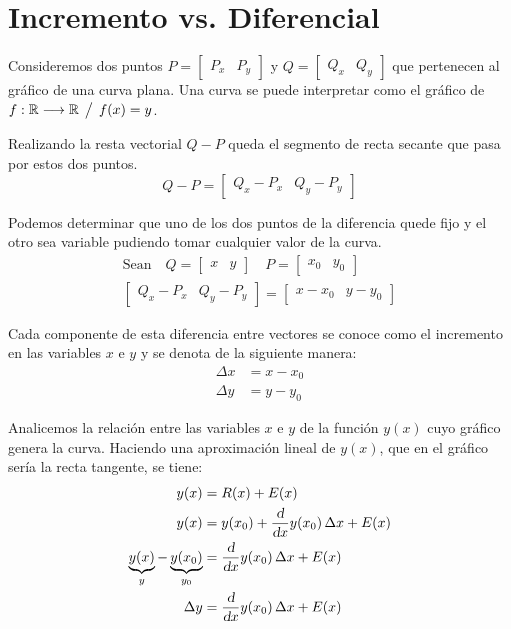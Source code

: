 \documentclass[a5paper,12pt,twoside]{book}
\begin{document}
\section{Incremento vs. Diferencial}

Consideremos dos puntos $P=\begin{bmatrix} P_x & P_y \end{bmatrix}$ y $Q=\begin{bmatrix} Q_x & Q_y \end{bmatrix}$ que pertenecen al gráfico de una curva plana.
Una curva se puede interpretar como el gráfico de $f:\mathbb{R} \longrightarrow \mathbb{R} \hspace{1ex} \big/ \hspace{1ex} f(x)=y$.

Realizando la resta vectorial $Q-P$ queda el segmento de recta secante que pasa por estos dos puntos.
\begin{equation*}
    Q-P = \begin{bmatrix} Q_x-P_x & Q_y-P_y \end{bmatrix}
\end{equation*}

Podemos determinar que uno de los dos puntos de la diferencia quede fijo y el otro sea variable pudiendo tomar cualquier valor de la curva.
\begin{gather*}
    \textrm{Sean} \quad
    Q = \begin{bmatrix}x&y\end{bmatrix} \quad P = \begin{bmatrix}x_0&y_0\end{bmatrix}
    \\
    \begin{bmatrix}Q_x-P_x & Q_y-P_y\end{bmatrix} = \begin{bmatrix}x-x_0 & y-y_0\end{bmatrix}
\end{gather*}

Cada componente de esta diferencia entre vectores se conoce como el incremento en las variables $x$ e $y$ y se denota de la siguiente manera:
\begin{align*}
    \Delta x &= x-x_0
    \\
    \Delta y &= y-y_0
\end{align*}

Analicemos la relación entre las variables $x$ e $y$ de la función $y(x)$ cuyo gráfico genera la curva.
Haciendo una aproximación lineal de $y(x)$, que en el gráfico sería la recta tangente, se tiene:
\begin{align*}
    y(x) &= R(x)+E(x)
    \\
    y(x) &= y(x_0) + \frac{\textsl{d}}{\textsl{d} x} y(x_0) \, \Delta x +E(x)
    \\
    \underbrace{y(x)}_y - \underbrace{y(x_0)}_{y_0} &= \frac{\textsl{d}}{\textsl{d} x} y(x_0) \, \Delta x +E(x)
    \\
    \Delta y &= \frac{\textsl{d}}{\textsl{d} x} y(x_0) \, \Delta x +E(x)
\end{align*}
\end{document}
